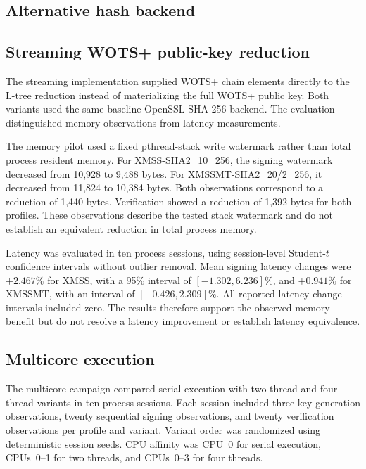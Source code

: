 \documentclass[pdflatex,sn-mathphys-num]{sn-jnl}
\begin{document}
\subsection{Alternative hash backend}


\label{subsec:hash_backend}

\subsection{Streaming WOTS+ public-key reduction}
\label{subsec:o5_streaming_review}

The streaming implementation supplied WOTS+ chain elements directly to
the L-tree reduction instead of materializing the full WOTS+ public key.
Both variants used the same baseline OpenSSL SHA-256 backend. The
evaluation distinguished memory observations from latency measurements.

The memory pilot used a fixed pthread-stack write watermark rather than
total process resident memory. For XMSS-SHA2\_10\_256, the signing
watermark decreased from 10,928 to 9,488 bytes. For
XMSSMT-SHA2\_20/2\_256, it decreased from 11,824 to 10,384 bytes.
Both observations correspond to a reduction of 1,440 bytes. Verification
showed a reduction of 1,392 bytes for both profiles. These observations
describe the tested stack watermark and do not establish an equivalent
reduction in total process memory.

Latency was evaluated in ten process sessions, using session-level
Student-$t$ confidence intervals without outlier removal. Mean signing
latency changes were $+2.467\%$ for XMSS, with a 95\% interval of
$[-1.302,6.236]\%$, and $+0.941\%$ for XMSSMT, with an interval of
$[-0.426,2.309]\%$. All reported latency-change intervals included zero.
The results therefore support the observed memory benefit but do not
resolve a latency improvement or establish latency equivalence.

\subsection{Multicore execution}
\label{subsec:o6_multicore_review}

The multicore campaign compared serial execution with two-thread and
four-thread variants in ten process sessions. Each session included
three key-generation observations, twenty sequential signing
observations, and twenty verification observations per profile and
variant. Variant order was randomized using deterministic session
seeds. CPU affinity was CPU~0 for serial execution, CPUs~0--1 for two
threads, and CPUs~0--3 for four threads.
\end{document}
